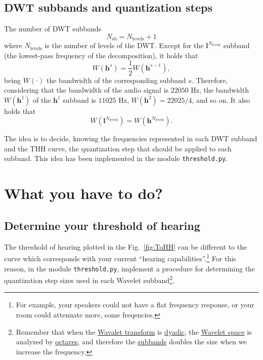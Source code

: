 \subsection{DWT subbands and quantization steps}
The number of DWT subbands
\begin{equation}
  N_{\text{sb}} = N_{\text{levels}} + 1
\end{equation}
where $N_{\text{levels}}$ is the number of levels of the DWT. Except
for the ${\mathbf l}^{N_{\text{levels}}}$ subband (the lowest-pass
frequency of the decomposition), it holds that
\begin{equation}
  W({\mathbf h}^s) = \frac{1}{2}W({\mathbf h}^{s-1}),
\end{equation}
being $W(\cdot)$ the bandwidth of the corresponding
subband $s$. Therefore, considering that the bandwidth of the audio signal
is $22050$ Hz, the bandwidth $W({\mathbf h}^1)$ of the ${\mathbf h}^1$ subband is $11025$ Hz,
$W({\mathbf h} ^2)=22025/4$, and so on. It also holds that
\begin{equation}
  W({\mathbf l}^{N_{\text{levels}}}) = W({\mathbf h}^{N_{\text{levels}}}).
\end{equation}

The idea is to decide, knowing the frequencies represented in each DWT
subband and the THH curve, the quantization step that should be
applied to each subband. This idea has been implemented in the module
\verb|threshold.py|.

\section{What you have to do?}

\subsection{Determine your threshold of hearing}

The threshold of hearing plotted in the Fig.~\ref{fig:ToHH} can be
different to the curve which corresponds with your current ``hearing
capabilities''.\footnote{For example, your speakers could not have a
  flat frequency response, or your room could attenuate more, some
  freqencies.} For this reason, in the module \verb|threshold.py|,
implement a procedure for determining the quantization step sizes used in
each Wavelet subband\footnote{Remember that when the
  \href{https://en.wikipedia.org/wiki/Wavelet_transform}{Wavalet
    transform} is
  \href{https://en.wikipedia.org/wiki/Dyadic_rational}{dyadic}, the
  \href{https://en.wikipedia.org/wiki/Discrete_wavelet_transform}{Wavelet
    space} is analyzed by
  \href{https://en.wikipedia.org/wiki/Octave_band}{octaves}, and
  therefore the
  \href{https://en.wikipedia.org/wiki/Filter_bank}{subbands} doubles
  the size when we increase the frequency.}.
  
